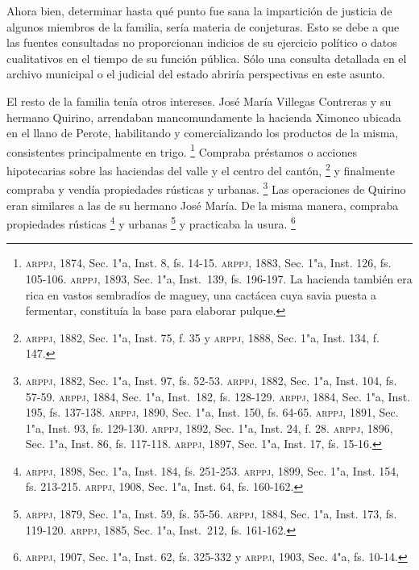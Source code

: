 \documentclass[14pt,twoside,final]{extbook} %
\let\oldfootnote\footnote
\renewcommand\footnote[1]{%
\oldfootnote{\hspace{1mm}#1}}
\begin{document}
Ahora bien, determinar hasta qué punto fue sana la impartición de justicia de algunos miembros de la familia, sería materia de conjeturas. Esto se debe a que las fuentes consultadas no proporcionan indicios de su ejercicio político o datos cualitativos en el tiempo de su función pública. Sólo una consulta detallada en el archivo municipal o el judicial del estado abriría perspectivas en este asunto.

El resto de la familia tenía otros intereses. José María Villegas Contreras y su hermano Quirino, arrendaban mancomundamente la hacienda Ximonco ubicada en el llano de Perote, habilitando y comercializando los productos de la misma, consistentes principalmente en trigo.\footnote{\textsc{arppj}, 1874, Sec. 1"a, Inst. 8, fs. 14-15. \textsc{arppj}, 1883, Sec. 1"a, Inst. 126, fs. 105-106. \textsc{arppj}, 1893, Sec. 1"a, Inst.~139, fs. 196-197. La hacienda también era rica en vastos sembradíos de maguey, una cactácea cuya savia puesta a fermentar, constituía la base para elaborar pulque.} Compraba préstamos o acciones hipotecarias sobre las haciendas del valle y el centro del cantón,\footnote{\textsc{arppj}, 1882, Sec. 1"a, Inst. 75, f. 35 y \textsc{arppj}, 1888, Sec. 1"a, Inst. 134, f. 147.} y finalmente compraba y vendía propiedades rústicas y urbanas.\footnote{\textsc{arppj}, 1882, Sec. 1"a, Inst. 97, fs. 52-53. \textsc{arppj}, 1882, Sec. 1"a, Inst. 104, fs. 57-59. \textsc{arppj}, 1884, Sec. 1"a, Inst.~182, fs. 128-129. \textsc{arppj}, 1884, Sec. 1"a, Inst. 195, fs. 137-138. \textsc{arppj}, 1890, Sec. 1"a, Inst. 150, fs. 64-65. \textsc{arppj}, 1891, Sec. 1"a, Inst. 93, fs. 129-130. \textsc{arppj}, 1892, Sec. 1"a, Inst. 24, f. 28. \textsc{arppj}, 1896, Sec. 1"a, Inst. 86, fs. 117-118. \textsc{arppj}, 1897, Sec. 1"a, Inst. 17, fs. 15-16.} Las operaciones de Quirino eran similares a las de su hermano José María. De la misma manera, compraba propiedades rústicas\footnote{\textsc{arppj}, 1898, Sec. 1"a, Inst. 184, fs. 251-253. \textsc{arppj}, 1899, Sec. 1"a, Inst. 154, fs. 213-215. \textsc{arppj}, 1908, Sec. 1"a, Inst. 64, fs. 160-162.} y urbanas\footnote{\textsc{arppj}, 1879, Sec. 1"a, Inst. 59, fs. 55-56. \textsc{arppj}, 1884, Sec. 1"a, Inst. 173, fs. 119-120. \textsc{arppj}, 1885, Sec. 1"a, Inst.~212, fs. 161-162.} y practicaba la usura.\footnote{\textsc{arppj}, 1907, Sec. 1"a, Inst. 62, fs. 325-332 y \textsc{arppj}, 1903, Sec. 4"a, fs. 10-14.}
\end{document}
